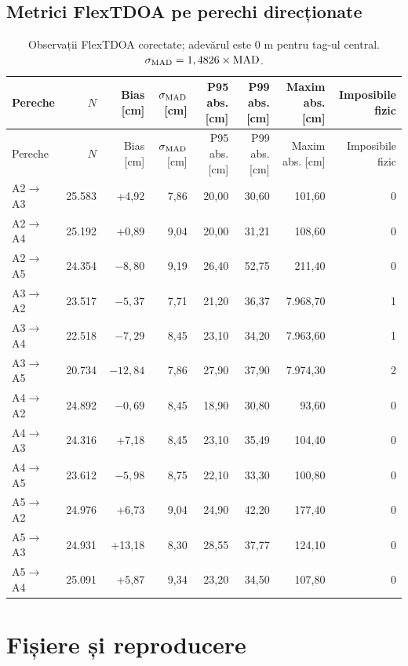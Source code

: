 \documentclass[11pt,a4paper]{article}
\begin{document}
\begin{landscape}
\section{Metrici FlexTDOA pe perechi direcționate}

\scriptsize
\begin{longtable}{lrrrrrrr}
  \caption{Observații FlexTDOA corectate; adevărul este 0 m pentru tag-ul
  central. $\sigma_{\rm MAD}=1,4826\times{\rm MAD}$.}\\
  \toprule
  Pereche & $N$ & Bias [cm] & $\sigma_{\rm MAD}$ [cm] & P95 abs. [cm] &
  P99 abs. [cm] & Maxim abs. [cm] & Imposibile fizic\\
  \midrule
  \endfirsthead
  \toprule
  Pereche & $N$ & Bias [cm] & $\sigma_{\rm MAD}$ [cm] & P95 abs. [cm] &
  P99 abs. [cm] & Maxim abs. [cm] & Imposibile fizic\\
  \midrule
  \endhead
  A2$\to$A3 & 25.583 & +4,92 & 7,86 & 20,00 & 30,60 & 101,60 & 0\\
  A2$\to$A4 & 25.192 & +0,89 & 9,04 & 20,00 & 31,21 & 108,60 & 0\\
  A2$\to$A5 & 24.354 & $-8,80$ & 9,19 & 26,40 & 52,75 & 211,40 & 0\\
  A3$\to$A2 & 23.517 & $-5,37$ & 7,71 & 21,20 & 36,37 & 7.968,70 & 1\\
  A3$\to$A4 & 22.518 & $-7,29$ & 8,45 & 23,10 & 34,20 & 7.963,60 & 1\\
  A3$\to$A5 & 20.734 & $-12,84$ & 7,86 & 27,90 & 37,90 & 7.974,30 & 2\\
  A4$\to$A2 & 24.892 & $-0,69$ & 8,45 & 18,90 & 30,80 & 93,60 & 0\\
  A4$\to$A3 & 24.316 & +7,18 & 8,45 & 23,10 & 35,49 & 104,40 & 0\\
  A4$\to$A5 & 23.612 & $-5,98$ & 8,75 & 22,10 & 33,30 & 100,80 & 0\\
  A5$\to$A2 & 24.976 & +6,73 & 9,04 & 24,90 & 42,20 & 177,40 & 0\\
  A5$\to$A3 & 24.931 & +13,18 & 8,30 & 28,55 & 37,77 & 124,10 & 0\\
  A5$\to$A4 & 25.091 & +5,87 & 9,34 & 23,20 & 34,50 & 107,80 & 0\\
  \bottomrule
\end{longtable}
\end{landscape}

\section{Fișiere și reproducere}
\end{document}
